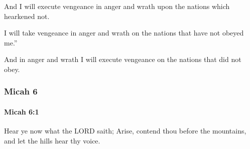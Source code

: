 			\begin{versebox}
					\item[BHS] 
					\item[LXX] 
					\item[ASV] And I will execute vengeance in anger and wrath upon the nations which hearkened not.
					\item[NIV] I will take vengeance in anger and wrath on the nations that have not obeyed me.”
					\item[NRSV] And in anger and wrath I will execute vengeance on the nations that did not obey.
			\end{versebox}
	\subsubsection{Micah 6} %
		\label{MICAH-6}

		\paragraph{Micah 6:1} %
			\label{MICAH-6-1}

			Hear ye now what the LORD saith; Arise, contend thou before the mountains, and let the hills hear thy voice.

